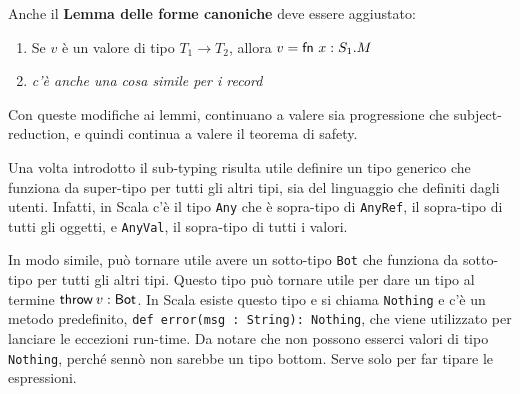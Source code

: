 \noindent Anche il \textbf{Lemma delle forme canoniche} deve essere aggiustato:

\begin{enumerate}
	\item Se $v$ è un valore di tipo $T_1 \to T_2$, allora $v = \fn x : S_1.M$
	\item \textit{c'è anche una cosa simile per i record}
\end{enumerate}

\noindent Con queste modifiche ai lemmi, continuano a valere sia progressione che subject-reduction, e quindi continua a valere il teorema di safety.

Una volta introdotto il sub-typing risulta utile definire un tipo generico che funziona da super-tipo per tutti gli altri tipi, sia del linguaggio che definiti dagli utenti.
Infatti, in Scala c'è il tipo \texttt{Any} che è sopra-tipo di \texttt{AnyRef}, il sopra-tipo di tutti gli oggetti, e \texttt{AnyVal}, il sopra-tipo di tutti i valori.

In modo simile, può tornare utile avere un sotto-tipo \texttt{Bot} che funziona da sotto-tipo per tutti gli altri tipi. Questo tipo può tornare utile per dare un tipo al termine $\throw{v}: \text{Bot}$. In Scala esiste questo tipo e si chiama \texttt{Nothing} e c'è un metodo predefinito, \texttt{def error(msg : String): Nothing}, che viene utilizzato per lanciare le eccezioni run-time. 
Da notare che non possono esserci valori di tipo \texttt{Nothing}, perché sennò non sarebbe un tipo bottom. Serve solo per far tipare le espressioni.



